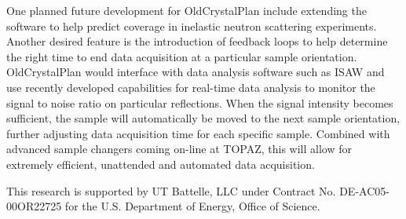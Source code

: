 \documentclass[final]{iucr}              %
\begin{document}
One planned future development for OldCrystalPlan include extending the software
to help predict coverage in inelastic neutron scattering experiments. Another
desired feature is the introduction of feedback loops to help determine the
right time to end data acquisition at a particular sample orientation.
OldCrystalPlan would interface with data analysis software such as ISAW and use
recently developed capabilities for real-time data analysis to monitor
the  signal to noise ratio on particular reflections. When the signal intensity
becomes sufficient, the sample will automatically be moved to the next sample
orientation, further adjusting data acquisition time for each specific sample.
Combined with advanced sample changers coming on-line at TOPAZ, this will allow
for extremely efficient, unattended and automated data acquisition.



























This research is supported by UT Battelle, LLC under Contract No.
DE-AC05-00OR22725 for the U.S. Department of Energy, Office of Science.



     
   
\end{document}
